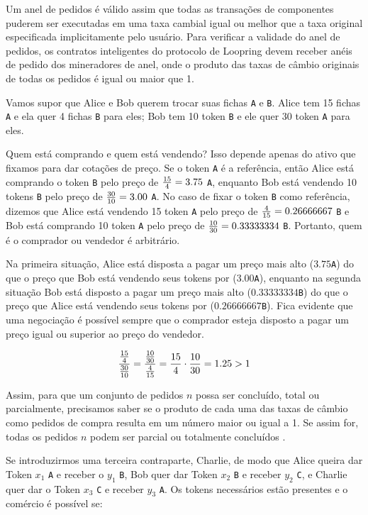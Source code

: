 \documentclass[UTF8,nofonts]{article}
\begin{document}
\begin{multicols}{2}
Um anel de pedidos é válido assim que todas as transações de componentes puderem ser executadas em uma taxa cambial igual ou melhor que a taxa original especificada implicitamente pelo usuário. Para verificar a validade do anel de pedidos, os contratos inteligentes do protocolo de Loopring devem receber anéis de pedido dos mineradores de anel, onde o produto das taxas de câmbio originais de todas os pedidos é igual ou maior que 1.

Vamos supor que Alice e Bob querem trocar suas fichas \verb|A| e \verb|B|. Alice tem 15 fichas \verb|A| e ela quer 4 fichas \verb|B| para eles; Bob tem 10 token \verb|B|   e ele quer 30 token \verb|A| para eles.

Quem está comprando e quem está vendendo? Isso depende apenas do ativo que fixamos para dar cotações de preço. Se o token \verb|A|  é a referência, então Alice está comprando o token \verb|B| pelo preço de ${15 \over 4} = 3.75$ \verb|A|, enquanto Bob está vendendo 10 tokens \verb|B| pelo preço de ${30 \over 10} = 3.00$ \verb|A|. No caso de fixar o token \verb|B| como referência, dizemos que Alice está vendendo 15 token \verb|A| pelo preço de ${4\over 15}=0.26666667$ \verb|B| e Bob está comprando 10 token \verb|A| pelo preço de ${10 \over 30}=0.33333334$ \verb|B|. Portanto, quem é o comprador ou vendedor é arbitrário.

 Na primeira situação, Alice está disposta a pagar um preço mais alto ($3.75$\verb|A|) do que o preço que Bob está vendendo seus tokens por ($3.00$\verb|A|), enquanto na segunda situação Bob está disposto a pagar um preço mais alto  ($0.33333334$\verb|B|) do que o preço  que Alice está vendendo seus tokens por ($0.26666667$\verb|B|).  Fica evidente que uma negociação é possível sempre que o comprador esteja disposto a pagar um preço igual ou superior ao preço do vendedor.


\begin{equation}
{{15\over 4} \over {30\over 10}} = {{10\over 30} \over {4\over 15}}={15 \over 4} \cdot {10 \over 30} = 1.25 > 1
\end{equation}

Assim, para que um conjunto de pedidos $n$ possa ser concluído, total ou parcialmente, precisamos saber se o produto de cada uma das taxas de câmbio como pedidos de compra resulta em um número maior ou igual a 1. Se assim for, todas os pedidos $n$ podem ser parcial ou totalmente concluídos \cite{supersymmetry}.

Se introduzirmos uma terceira contraparte, Charlie, de modo que Alice queira dar Token $x_1$ \verb|A| e receber o $y_1$ \verb|B|, Bob quer dar Token $x_2$ \verb|B| e receber $y_2$  \verb|C|,  e Charlie quer dar o Token $x_3$ \verb|C| e receber  $y_3$ \verb|A|. Os tokens necessários estão presentes e o comércio é possível se:



\end{multicols}
\end{document}
